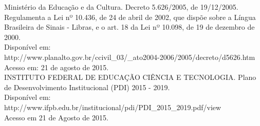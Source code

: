 Ministério da Educação e da Cultura. Decreto 5.626/2005, de 19/12/2005. Regulamenta a Lei nº 10.436, de 24 de abril de 2002, que dispõe sobre a Língua Brasileira de Sinais - Libras, e o art. 18 da Lei nº 10.098, de 19 de dezembro de 2000.\\
Disponível em:\\ http://www.planalto.gov.br/ccivil\_03/\_ato2004-2006/2005/decreto/d5626.htm\\Acesso em: 21 de agosto de 2015.\\

INSTITUTO FEDERAL DE EDUCAÇÃO CIÊNCIA E TECNOLOGIA. Plano de Desenvolvimento Institucional (PDI) 2015 - 2019.\\
Disponível em:\\ http://www.ifpb.edu.br/institucional/pdi/PDI\_2015\_2019.pdf/view\\
Acesso em 21 de Agosto de 2015.\\
